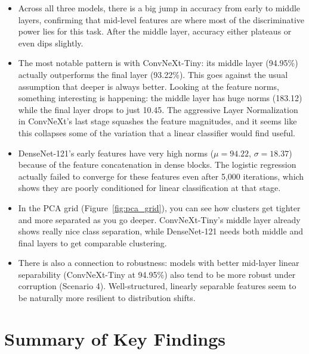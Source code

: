 \documentclass[11pt,a4paper]{article}
\begin{document}
\begin{itemize}
  \item Across all three models, there is a big jump in accuracy from early to middle layers, confirming that mid-level features are where most of the discriminative power lies for this task. After the middle layer, accuracy either plateaus or even dips slightly.
  \item The most notable pattern is with ConvNeXt-Tiny: its middle layer (94.95\%) actually outperforms the final layer (93.22\%). This goes against the usual assumption that deeper is always better. Looking at the feature norms, something interesting is happening: the middle layer has huge norms (183.12) while the final layer drops to just 10.45. The aggressive Layer Normalization in ConvNeXt's last stage squashes the feature magnitudes, and it seems like this collapses some of the variation that a linear classifier would find useful.
  \item DenseNet-121's early features have very high norms ($\mu = 94.22$, $\sigma = 18.37$) because of the feature concatenation in dense blocks. The logistic regression actually failed to converge for these features even after 5,000 iterations, which shows they are poorly conditioned for linear classification at that stage.
  \item In the PCA grid (Figure~\ref{fig:pca_grid}), you can see how clusters get tighter and more separated as you go deeper. ConvNeXt-Tiny's middle layer already shows really nice class separation, while DenseNet-121 needs both middle and final layers to get comparable clustering.
  \item There is also a connection to robustness: models with better mid-layer linear separability (ConvNeXt-Tiny at 94.95\%) also tend to be more robust under corruption (Scenario 4). Well-structured, linearly separable features seem to be naturally more resilient to distribution shifts.
\end{itemize}

\section{Summary of Key Findings}
\end{document}
